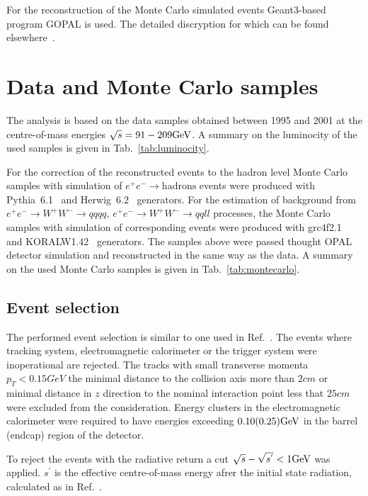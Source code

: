 For the reconstruction of the Monte Carlo simulated events Geant3-based~\cite{Brun:1987ma} program GOPAL
is used. The detailed discryption for which can be found elsewhere~\cite{Allison:1991bf}.

\section{Data and Monte Carlo samples}
\label{sec:selection}
The analysis is based on the data samples obtained between 1995 and 2001 
at the centre-of-mass energies $\sqrt{s}=91-209{\text{Ge}\kern-0.06667em\text{V\/}}$. A summary on the luminocity
of the used samples is given in Tab.~\ref{tab:luminocity}.


For the correction of the reconstructed events to the hadron level 
Monte Carlo samples with simulation of $e^+e^-\rightarrow 
\text{hadrons}$ events were produced with Pythia~6.1~\cite{Sjostrand:2000wi} and 
 Herwig~6.2~\cite{Corcella:2000bw} generators.
For the estimation of background  from $e^+e^-\rightarrow W^+W^-\rightarrow qqqq$, 
$e^+e^-\rightarrow W^+W^-\rightarrow qqll$ processes,
 the Monte Carlo samples with simulation of corresponding events 
 were produced with grc4f2.1~\cite{Fujimoto:1996wj} and  KORALW1.42~\cite{Skrzypek:1995wd} generators.
The samples above were passed thought OPAL detector simulation and reconstructed
in the same way as the data.
A summary on  the used Monte Carlo samples is given in Tab.~\ref{tab:montecarlo}.
\TABmontecarlo


\subsection{Event selection}
\label{sec:selection}
The performed event selection is similar to one used in Ref.~\cite{Abbiendi:2004qz}.
The events where tracking system, electromagnetic calorimeter or the trigger system were inoperational are rejected.
The tracks with small transverse momenta $p_{T}<0.15GeV$ the minimal  distance to the 
collision axis more than $2cm$ or minimal distance in $z$ direction to the nominal interaction point less that $25cm$
were excluded from the consideration. 
Energy clusters in the electromagnetic calorimeter were required to have energies exceeding $0.10(0.25) {\text{Ge}\kern-0.06667em\text{V\/}}$ in 
the barrel (endcap) region of the detector.

To reject the events with  the radiative return a cut $\sqrt{s}-\sqrt{s^{'}}<1{\text{Ge}\kern-0.06667em\text{V\/}}$ was applied. 
${s}^{'}$ is the effective centre-of-mass energy afrer the initial state radiation, calculated as in Ref.~\cite{Abbiendi:2003dh}.

